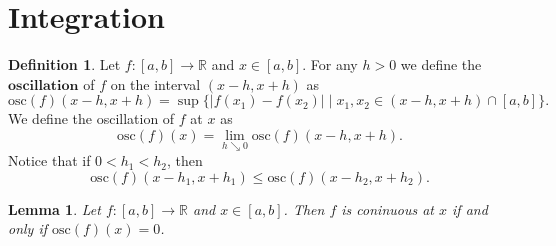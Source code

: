 \documentclass[12pt]{article}
\newtheorem{lemma}[theorem]{Lemma}
\theoremstyle{definition}
\newtheorem{definition}{Definition}[section]
\theoremstyle{definition}
\newcommand{\abs}[1]{\lvert #1 \rvert}
\begin{document}
    \section{Integration}
    \begin{definition}
        Let $f:[a, b]\to\mathbb{R}$ and $x\in[a, b]$. For any $h>0$ we define
        the $\textbf{oscillation}$ of $f$ on the interval $(x-h, x+h)$ as 
            \begin{equation*}
                \text{osc}(f)(x-h, x+h)=\sup\{\abs{f(x_1)-f(x_2)}\mid x_1,
                x_2\in(x-h, x+h)\cap[a, b]\}.
            \end{equation*}
        We define the oscillation of $f$ at $x$ as 
            \begin{equation*}
                \text{osc}(f)(x)=\lim_{h\searrow 0}\text{osc}(f)(x-h, x+h).
            \end{equation*}
        Notice that if $0<h_1<h_2$, then 
            \begin{equation*}
                \text{osc}(f)(x-h_1, x+h_1)\leq\text{osc}(f)(x-h_2, x+h_2).
            \end{equation*}
    \end{definition}\newpage
    \begin{lemma}
        Let $f:[a, b]\to\mathbb{R}$ and $x\in[a, b]$. Then $f$ is coninuous at
        $x$ if and only if $\text{osc}(f)(x)=0$.
    \end{lemma}
\end{document}
